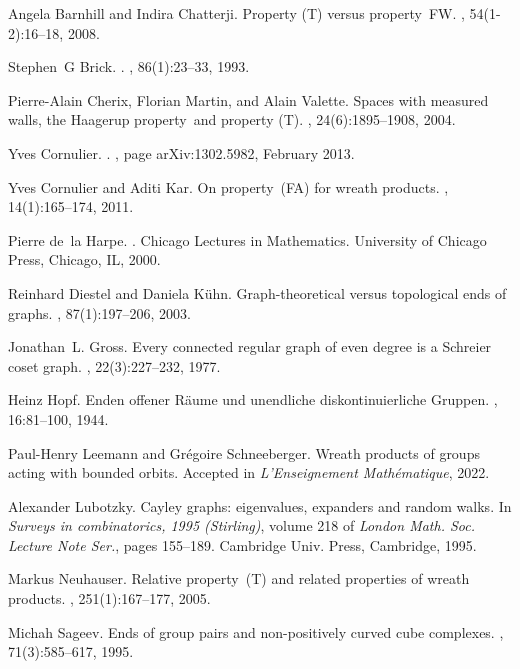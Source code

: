 \documentclass[a4paper]{article}
\theoremstyle{definition}
\theoremstyle{remark}
\begin{document}
\begin{thebibliography}{10}

Angela Barnhill and Indira Chatterji.
\newblock Property ({T}) versus property~{FW}.
, 54(1-2):16--18, 2008.

Stephen~G Brick.
.
, 86(1):23--33, 1993.

Pierre-Alain Cherix, Florian Martin, and Alain Valette.
\newblock Spaces with measured walls, the {H}aagerup property~and property
  ({T}).
, 24(6):1895--1908, 2004.

Yves {Cornulier}.
.
, page arXiv:1302.5982, February 2013.

Yves Cornulier and Aditi Kar.
\newblock On property~({FA}) for wreath products.
, 14(1):165--174, 2011.

Pierre de~la Harpe.
.
\newblock Chicago Lectures in Mathematics. University of Chicago Press,
  Chicago, IL, 2000.

Reinhard Diestel and Daniela K\"{u}hn.
\newblock Graph-theoretical versus topological ends of graphs.
, 87(1):197--206, 2003.

Jonathan~L. Gross.
\newblock Every connected regular graph of even degree is a {S}chreier coset
  graph.
, 22(3):227--232, 1977.

Heinz Hopf.
\newblock Enden offener {R}\"{a}ume und unendliche diskontinuierliche
  {G}ruppen.
, 16:81--100, 1944.

Paul-Henry Leemann and Gr{\'e}goire Schneeberger.
\newblock Wreath products of groups acting with bounded orbits.
\newblock Accepted in {\em L’Enseignement Math\'ematique}, 2022.

Alexander Lubotzky.
\newblock Cayley graphs: eigenvalues, expanders and random walks.
\newblock In {\em Surveys in combinatorics, 1995 ({S}tirling)}, volume 218 of
  {\em London Math. Soc. Lecture Note Ser.}, pages 155--189. Cambridge Univ.
  Press, Cambridge, 1995.

Markus Neuhauser.
\newblock Relative property~({T}) and related properties of wreath products.
, 251(1):167--177, 2005.

Michah Sageev.
\newblock Ends of group pairs and non-positively curved cube complexes.
, 71(3):585--617, 1995.

\end{thebibliography}

%
%
%
%
%
\enddocument
\end{document}
